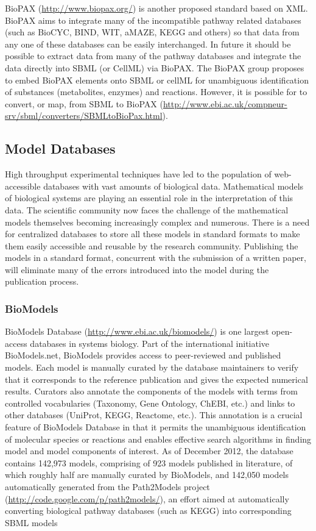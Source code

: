 \documentclass[]{article}
\begin{document}
BioPAX (\url{http://www.biopax.org/}) \autocite{demir2010biopax}
\autocite{stromback2005representations} is another proposed standard
based on XML. BioPAX aims to integrate many of the incompatible pathway
related databases (such as BioCYC, BIND, WIT, aMAZE, KEGG and others) so
that data from any one of these databases can be easily interchanged. In
future it should be possible to extract data from many of the pathway
databases and integrate the data directly into SBML (or CellML) via
BioPAX. The BioPAX group proposes to embed BioPAX elements onto SBML or
cellML for unambiguous identification of substances (metabolites,
enzymes) and reactions. However, it is possible for to convert, or map,
from SBML to BioPAX
(\url{http://www.ebi.ac.uk/compneur-srv/sbml/converters/SBMLtoBioPax.html}).

\subsection{Model Databases}

High throughput experimental techniques have led to the population of
web- accessible databases with vast amounts of biological data.
Mathematical models of biological systems are playing an essential role
in the interpretation of this data. The scientific community now faces
the challenge of the mathematical models themselves becoming
increasingly complex and numerous. There is a need for centralized
databases to store all these models in standard formats to make them
easily accessible and reusable by the research community. Publishing the
models in a standard format, concurrent with the submission of a written
paper, will eliminate many of the errors introduced into the model
during the publication process.

\subsubsection{BioModels}

BioModels Database (\url{http://www.ebi.ac.uk/biomodels/})
\autocite{le2006biomodels} is one largest open- access databases in
systems biology. Part of the international initiative BioModels.net,
BioModels provides access to peer-reviewed and published models. Each
model is manually curated by the database maintainers to verify that it
corresponds to the reference publication and gives the expected
numerical results. Curators also annotate the components of the models
with terms from controlled vocabularies (Taxonomy, Gene Ontology, ChEBI,
etc.) and links to other databases (UniProt, KEGG, Reactome, etc.). This
annotation is a crucial feature of BioModels Database in that it permits
the unambiguous identification of molecular species or reactions and
enables effective search algorithms in finding model and model
components of interest. As of December 2012, the database contains
142,973 models, comprising of 923 models published in literature, of
which roughly half are manually curated by BioModels, and 142,050 models
automatically generated from the Path2Models project
(\url{http://code.google.com/p/path2models/}), an effort aimed at
automatically converting biological pathway databases (such as KEGG)
into corresponding SBML models
\end{document}
